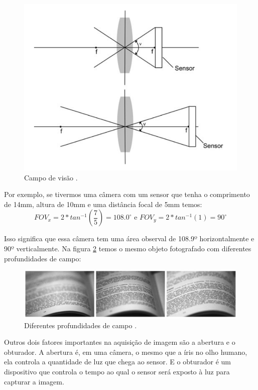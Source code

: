 \documentclass[
  brazilian,
]{book}
\begin{document}
\begin{figure}

{\centering \includegraphics[width=0.55\linewidth]{imagens/02-formacao/campovisao} 

}

\caption{Campo de visão \autocite[p.14]{moeslund2012}.}\label{fig:campovisao}
\end{figure}

Por exemplo, se tivermos uma câmera com um sensor que tenha o comprimento de 14mm, altura de 10mm e uma distância focal de 5mm temos:
\[FOV_x=2*tan^{-1}\left(\frac{7}{5}\right)=108.0^{\circ} \text{ e } FOV_y=2*tan^{-1}(1)=90^{\circ}\]

Isso significa que essa câmera tem uma área observal de 108.9º horizontalmente e 90º verticalmente. Na figura \ref{fig:diferentesprofundidades} temos o mesmo objeto fotografado com diferentes profundidades de campo:



\begin{figure}

{\centering \includegraphics[width=0.9\linewidth]{imagens/02-formacao/diferentesprofundidades} 

}

\caption{Diferentes profundidades de campo \autocite[p.15]{moeslund2012}.}\label{fig:diferentesprofundidades}
\end{figure}

Outros dois fatores importantes na aquisição de imagem são a abertura e o obturador. A abertura é, em uma câmera, o mesmo que a íris no olho humano, ela controla a quantidade de luz que chega ao sensor. E o obturador é um dispositivo que controla o tempo ao qual o sensor será exposto à luz para capturar a imagem.
\end{document}
